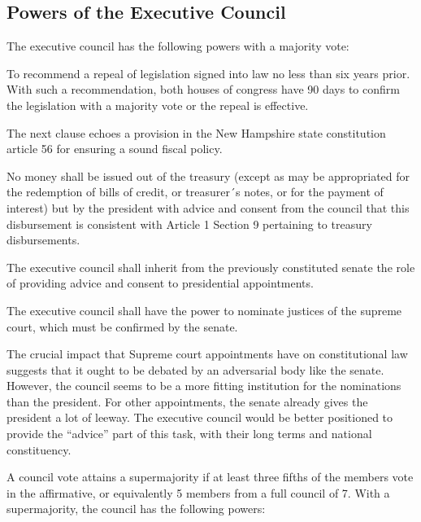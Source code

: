 \documentclass{article}
\begin{document}
\subsection{Powers of the Executive Council}

\begin{quoting}
The executive council has the following powers with a majority vote:

To recommend a repeal of legislation signed into law no less than six years prior. With such a recommendation, both houses of congress have 90 days to confirm the legislation with a majority vote or the repeal is effective.
\end{quoting}

The next clause echoes a provision in the New Hampshire state constitution article 56 for ensuring a sound fiscal policy.

\begin{quoting}
No money shall be issued out of the treasury (except as may be appropriated for the redemption of bills of credit, or treasurer´s notes, or for the payment of interest) but by the president with advice and consent from the council that this disbursement is consistent with Article 1 Section 9 pertaining to treasury disbursements.

The executive council shall inherit from the previously constituted senate the role of providing advice and consent to presidential appointments.

The executive council shall have the power to nominate justices of the supreme court, which must be confirmed by the senate.
\end{quoting}

The crucial impact that Supreme court appointments have on constitutional law suggests that it ought to be debated by an adversarial body like the senate. However, the council seems to be a more fitting institution for the nominations than the president. For other appointments, the senate already gives the president a lot of leeway. The executive council would be better positioned to provide the “advice” part of this task, with their long terms and national constituency.

\begin{quoting}
A council vote attains a supermajority if at least three fifths of the members vote in the affirmative, or equivalently 5 members from a full council of 7. With a supermajority, the council has the following powers:
\end{quoting}
\end{document}
